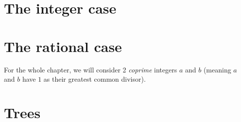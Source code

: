 \documentclass[12pt]{report}
\begin{document}
\tableofcontents

\chapter{The integer case}





\chapter{The rational case}

For the whole chapter, we will consider 2 \emph{coprime}
integers $a$ and $b$ (meaning $a$ and $b$ have $1$ as their
greatest common divisor).





\chapter{Trees}






\end{document}
